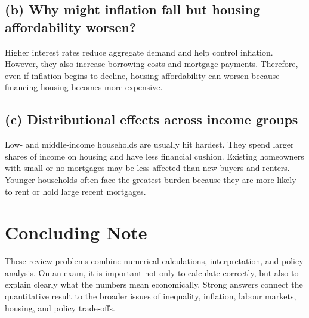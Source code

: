 \documentclass[12pt]{article}
\begin{document}
\subsection*{(b) Why might inflation fall but housing affordability worsen?}

Higher interest rates reduce aggregate demand and help control inflation. However, they also increase borrowing costs and mortgage payments. Therefore, even if inflation begins to decline, housing affordability can worsen because financing housing becomes more expensive.

\subsection*{(c) Distributional effects across income groups}

Low- and middle-income households are usually hit hardest. They spend larger shares of income on housing and have less financial cushion. Existing homeowners with small or no mortgages may be less affected than new buyers and renters. Younger households often face the greatest burden because they are more likely to rent or hold large recent mortgages.

\section*{Concluding Note}

These review problems combine numerical calculations, interpretation, and policy analysis. On an exam, it is important not only to calculate correctly, but also to explain clearly what the numbers mean economically. Strong answers connect the quantitative result to the broader issues of inequality, inflation, labour markets, housing, and policy trade-offs.
\end{document}
